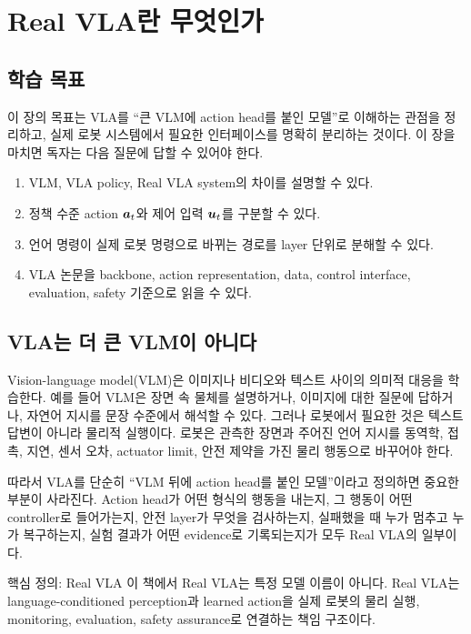 \chapter{Real VLA란 무엇인가}

\section*{학습 목표}
이 장의 목표는 VLA를 ``큰 VLM에 action head를 붙인 모델''로 이해하는 관점을 정리하고, 실제 로봇 시스템에서 필요한 인터페이스를 명확히 분리하는 것이다. 이 장을 마치면 독자는 다음 질문에 답할 수 있어야 한다.

\begin{enumerate}
  \item VLM, VLA policy, Real VLA system의 차이를 설명할 수 있다.
  \item 정책 수준 action $\bm{a}_t$와 제어 입력 $\bm{u}_t$를 구분할 수 있다.
  \item 언어 명령이 실제 로봇 명령으로 바뀌는 경로를 layer 단위로 분해할 수 있다.
  \item VLA 논문을 backbone, action representation, data, control interface, evaluation, safety 기준으로 읽을 수 있다.
\end{enumerate}

\section{VLA는 더 큰 VLM이 아니다}

Vision-language model(VLM)은 이미지나 비디오와 텍스트 사이의 의미적 대응을 학습한다. 예를 들어 VLM은 장면 속 물체를 설명하거나, 이미지에 대한 질문에 답하거나, 자연어 지시를 문장 수준에서 해석할 수 있다. 그러나 로봇에서 필요한 것은 텍스트 답변이 아니라 물리적 실행이다. 로봇은 관측한 장면과 주어진 언어 지시를 동역학, 접촉, 지연, 센서 오차, actuator limit, 안전 제약을 가진 물리 행동으로 바꾸어야 한다.

따라서 VLA를 단순히 ``VLM 뒤에 action head를 붙인 모델''이라고 정의하면 중요한 부분이 사라진다. Action head가 어떤 형식의 행동을 내는지, 그 행동이 어떤 controller로 들어가는지, 안전 layer가 무엇을 검사하는지, 실패했을 때 누가 멈추고 누가 복구하는지, 실험 결과가 어떤 evidence로 기록되는지가 모두 Real VLA의 일부이다.

\begin{definitionbox}{핵심 정의: Real VLA}
이 책에서 Real VLA는 특정 모델 이름이 아니다. Real VLA는 language-conditioned perception과 learned action을 실제 로봇의 물리 실행, monitoring, evaluation, safety assurance로 연결하는 책임 구조이다.
\end{definitionbox}

